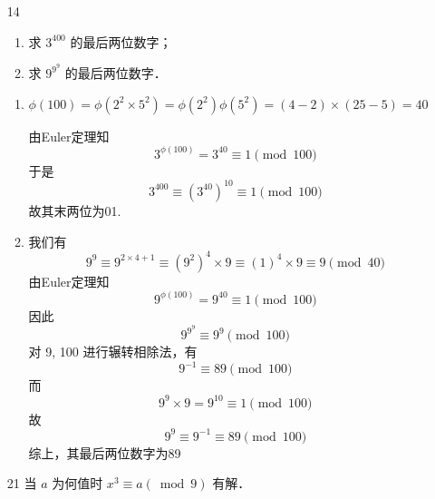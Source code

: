 \begin{enumerate}
    \item[14] \begin{enumerate}
        \item 求 $3^{400}$ 的最后两位数字；
        \item 求 $9^{9^9}$ 的最后两位数字．
    \end{enumerate}

\begin{solution}
    \begin{enumerate}
        \item $\phi(100) = \phi(2^2 \times 5^2) = \phi(2^2) \phi(5^2) = (4-2) \times (25-5) = 40$
        
    由Euler定理知
    \begin{equation*}
        3^{\phi(100)} = 3^{40} \equiv 1 \pmod{100}
    \end{equation*}
    于是
    \begin{equation*}
        3^{400} \equiv (3^{40})^{10} \equiv 1 \pmod{100}
    \end{equation*}
    故其末两位为01.
    
    \item 我们有
    \begin{equation*}
        9^9 \equiv 9^{2 \times 4+1} \equiv (9^2)^4 \times 9 \equiv (1)^4 \times 9 \equiv 9 \pmod{40}
    \end{equation*}
    由Euler定理知
    \begin{equation*}
        9^{\phi(100)} = 9^{40} \equiv 1 \pmod{100}
    \end{equation*}
    因此
    \begin{equation*}
        9^{9^9} \equiv 9^9 \pmod{100}
    \end{equation*}
    对 9, 100 进行辗转相除法，有
    \begin{equation*}
        9^{-1} \equiv 89 \pmod{100}
    \end{equation*}
    而
    \begin{equation*}
        9^9 \times 9 = 9^{10} \equiv 1 \pmod{100}
    \end{equation*}
    故
    \begin{equation*}
        9^9 \equiv 9^{-1} \equiv 89 \pmod{100}
    \end{equation*}
    综上，其最后两位数字为89
    \end{enumerate}
\end{solution}

    \item[21] 当 $a$ 为何值时 $x^3 \equiv a(\bmod 9)$ 有解．
    

\end{enumerate}
